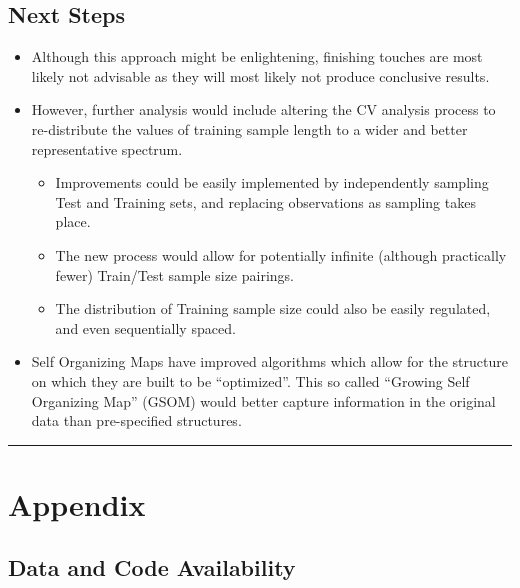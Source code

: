 \documentclass[12pt,]{article}
\providecommand{\tightlist}{%
  \setlength{\itemsep}{0pt}\setlength{\parskip}{0pt}}
\begin{document}
\hypertarget{next-steps}{%
\subsection{Next Steps}\label{next-steps}}

\begin{itemize}
\tightlist
\item
  Although this approach might be enlightening, finishing touches are
  most likely not advisable as they will most likely not produce
  conclusive results.
\item
  However, further analysis would include altering the CV analysis
  process to re-distribute the values of training sample length to a
  wider and better representative spectrum.

  \begin{itemize}
  \tightlist
  \item
    Improvements could be easily implemented by independently sampling
    Test and Training sets, and replacing observations as sampling takes
    place.
  \item
    The new process would allow for potentially infinite (although
    practically fewer) Train/Test sample size pairings.
  \item
    The distribution of Training sample size could also be easily
    regulated, and even sequentially spaced.
  \end{itemize}
\item
  Self Organizing Maps have improved algorithms which allow for the
  structure on which they are built to be ``optimized''. This so called
  ``Growing Self Organizing Map'' (GSOM) would better capture
  information in the original data than pre-specified structures.
\end{itemize}

\begin{center}\rule{0.5\linewidth}{\linethickness}\end{center}

\hypertarget{appendix}{%
\section{Appendix}\label{appendix}}

\hypertarget{data-and-code-availability}{%
\subsection{Data and Code
Availability}\label{data-and-code-availability}}
\end{document}

